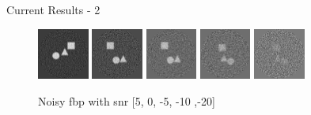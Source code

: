 \documentclass[aspectratio=169]{beamer}
\begin{document}
\begin{frame}{Current Results - 2}
    
    \begin{figure}
        \includegraphics[width=0.15\textwidth]{noisy_fbp_5}
        \includegraphics[width=0.15\textwidth]{noisy_fbp_0}
        \includegraphics[width=0.15\textwidth]{noisy_fbp_n5}
        \includegraphics[width=0.15\textwidth]{noisy_fbp_n10}
        \includegraphics[width=0.15\textwidth]{noisy_fbp_n20}
        \caption{Noisy fbp with snr [5, 0, -5, -10 ,-20]}
    \end{figure}


\end{frame}
\end{document}
